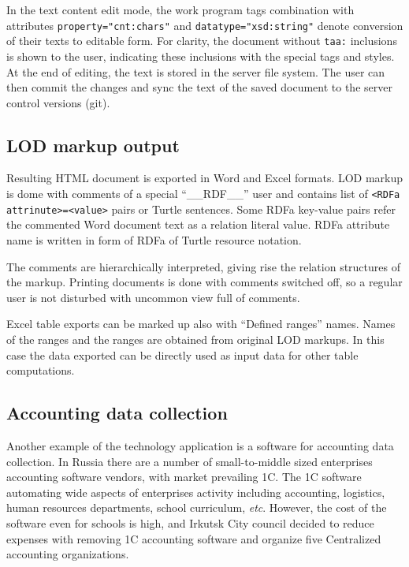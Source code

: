 \documentclass[conference,a4paper]{IEEEtran}
\begin{document}
In the text content edit mode, the work program tags combination with attributes \texttt{property="cnt:chars"} and \texttt{datatype="xsd:string"} denote conversion of their texts to editable form.  For clarity, the document without \texttt{taa:} inclusions is shown to the user, indicating these inclusions with the special tags and styles.  At the end of editing, the text is stored in the server file system.  The user can then commit the changes and sync the text of the saved document to the server control versions (git).

\subsection{LOD markup output}
\label{sec:lod-out}

Resulting HTML document is exported in Word and Excel formats.  LOD markup is dome with comments of a special ``\_\_RDF\_\_'' user and contains list of \texttt{<RDFa attrinute>=<value>} pairs or Turtle sentences.  Some RDFa key-value pairs refer the commented Word document text as a relation literal value.  RDFa attribute name is written in form of RDFa of Turtle resource notation.

The comments are hierarchically interpreted, giving rise the relation structures of the markup.  Printing documents is done with comments switched off, so a regular user is not disturbed with uncommon view full of comments.

Excel table exports can be marked up also with ``Defined ranges'' names.  Names of the ranges and the ranges are obtained from original LOD markups.  In this case the data exported can be directly used as input data for other table computations.

\subsection{Accounting data collection}
\label{sec:accounting}

Another example of the technology application is a software for accounting data collection.  In Russia there are a number of small-to-middle sized enterprises accounting software vendors, with market prevailing 1C.  The 1C software automating wide aspects of enterprises activity including accounting, logistics, human resources departments, school curriculum, \textit{etc}.  However, the cost of the software even for schools is high, and Irkutsk City council decided to reduce expenses with removing 1C accounting software and organize five Centralized accounting organizations.
\end{document}
